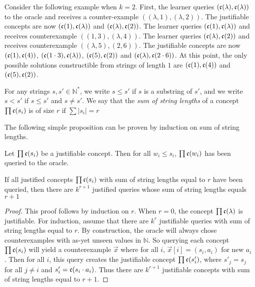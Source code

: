\documentclass[11pt]{amsart}
\begin{document}
Consider the following example when $k = 2$. 
First, the learner queries $(\mathfrak{c}(\lambda), \mathfrak{c}(\lambda))$ to the oracle and receives a counter-example $((\lambda, 1), (\lambda, 2))$. 
The justifiable concepts are now $(\mathfrak{c}(1), \mathfrak{c}(\lambda))$ and $(\mathfrak{c}(\lambda), \mathfrak{c}(2))$. 
The learner queries $(\mathfrak{c}(1), \mathfrak{c}(\lambda))$ and receives counterexample  $((1, 3), (\lambda, 4))$. 
 The learner queries $(\mathfrak{c}(\lambda), \mathfrak{c}(2))$ and receives counterexample $((\lambda, 5), (2, 6))$.
The justifiable concepts are now  $(\mathfrak{c}(1), \mathfrak{c}(4))$, $(\mathfrak{c}(1 \cdot 3), \mathfrak{c}(\lambda))$, $(\mathfrak{c}(5), \mathfrak{c}(2))$ and $(\mathfrak{c}(\lambda), \mathfrak{c}(2 \cdot 6))$.  
At this point, the only possible solutions constructible from strings of length $1$ are $(\mathfrak{c}(1), \mathfrak{c}(4))$ and $(\mathfrak{c}(5), \mathfrak{c}(2))$. 





For any strings $s,s' \in \mathbb{N}^*$, we write $s \le s'$ if $s$ is a substring of $s'$, and we write $s < s'$ if $s \le s'$ and $s \ne s'$.
We say that the \emph{sum of string lengths} of a concept $\prod \mathfrak{c}(s_i)$ is of size $r$ if $\sum |s_i| = r$

The following simple proposition can be proven by induction on sum of string lengths.

\begin{proposition}
\label{subjust}
Let $\prod \mathfrak{c}(s_i)$ be a justifiable concept. 
Then for all $w_i \le s_i$, $\prod \mathfrak{c}(w_i)$ has been queried to the oracle.
\end{proposition}

\begin{proposition}
\label{numjustconc}
If all justified concepts $\prod \mathfrak{c}(s_i)$ with sum of string lengths equal to $r$ have been queried, then there are $k^{r+1}$ justified queries whose sum of string lengths equals $r+1$
\end{proposition}
\begin{proof}
This proof follows by induction on $r$. 
When $r=0$, the concept $\prod \mathfrak{c}(\lambda)$ is justifiable.%
For induction, assume that there are $k^r$ justifiable queries with sum of string lengths equal to $r$. 
By construction, the oracle will always chose counterexamples with as-yet unseen values in $\mathbb{N}$. 
So querying each concept $\prod \mathfrak{c}(s_i)$ will yield a counterexample $\vec{x}$ where for all $i$, $\vec{x}[i] = (s_i, a_i)$ for new $a_i$.
Then for all $i$, this query creates the justifiable concept $\prod \mathfrak{c}(s'_i)$, where $s'_j = s_j$ for all $j \ne i$ and $s'_i = \mathfrak{c}(s_i \cdot a_i)$.
Thus there are $k^{r+1}$ justifiable concepts with sum of string lengths equal to $r+1$.
\end{proof}
\end{document}
